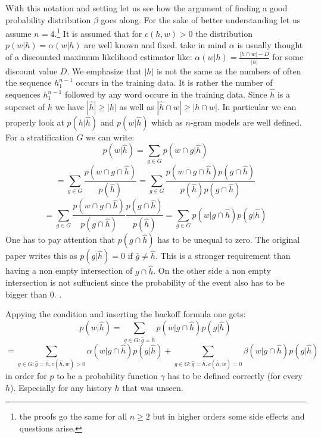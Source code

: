 \documentclass[•]{book}
\begin{document}
\begin{appendix}
With this notation and setting let us see how the argument of finding a good probability distribution $\beta$ goes along. 
For the sake of better understanding let us assume $n=4$.\footnote{the proofs go the same for all $n\geq 2$ but in higher orders some side effects and questions arise.}
It is assumed that for $c(h,w)>0$ the distribution $p(w|h)=\alpha(w|h)$ are well known and fixed. 
take in mind $\alpha$ is usually thought of a discounted maximum likelihood estimator like: $\alpha(w|h)=\frac{|h \cap w|-D}{|h|}$ for some discount value $D$.
We emphasize that $|h|$ is not the same as the numbers of often the sequence $h_1^{n-1}$ occurs in the training data.
It is rather the number of sequences $h_1^{n-1}$ followed by any word occure in the training data. 
Since $\hat h$ is a superset of $h$ we have $|\hat h| \geq |h|$ as well as $|\hat h \cap w| \geq |h \cap w|$.
In particular we can properly look at $p(h|\hat h)$ and $p(w|\hat h)$ which as $n$-gram models are well defined.
For a stratification $G$ we can write: 
\[
p(w|\hat h) = \sum_{g\in G}p(w\cap g|\hat h)
\]
\[
=\sum_{g\in G}\frac{p(w \cap g \cap \hat h)}{p(\hat h)}=\sum_{g\in G}\frac{p(w \cap g \cap \hat h)p(g \cap \hat h)}{p(\hat h)p(g \cap \hat h)}
\]
\[
=\sum_{g\in G}\frac{p(w \cap g \cap \hat h)}{p(g\cap \hat h)}\frac{p(g\cap\hat h)}{p(\hat h)} = \sum_{g\in G}p(w|g\cap \hat h)p(g|\hat h)
\]
One has to pay attention that $p(g\cap \hat h)$ has to be unequal to zero. 
The original paper writes this as $p(g|\hat h)=0$ if $\hat g \neq \hat h$. 
This is a stronger requirement than having a non empty intersection of $g \cap \hat h$. 
On the other side a non empty intersection is not suffucient since the probability of the event also has to be bigger than 0.
.

Appying the condition and inserting the backoff formula one gets:
\[
p(w|\hat h) =  \sum_{g\in G:\hat g = \hat h}p(w|g\cap \hat h)p(g|\hat h)
\]
\[
=  \sum_{g\in G:\hat g = \hat h, c(\hat h, w)>0}\alpha(w|g\cap \hat h)p(g|\hat h) +  \sum_{g\in G:\hat g = \hat h, c(\hat h,w)=0}\beta(w|g\cap \hat h)p(g|\hat h)
\]
in order for $p$ to be a probability function $\gamma$ has to be defined correctly (for every $h$). 
Especially for any history $h$ that was unseen. 


\end{appendix}
\end{document}

